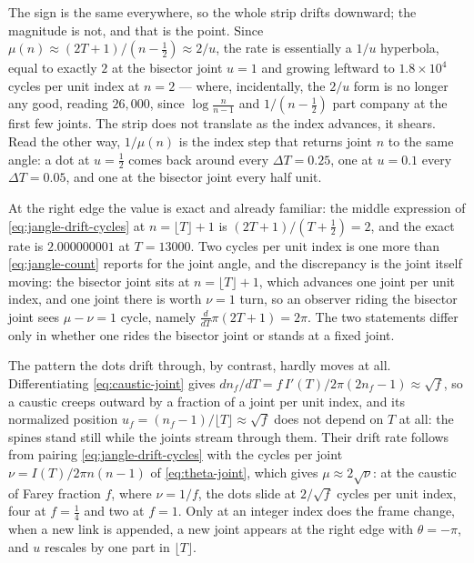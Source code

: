 \documentclass[11pt]{article}
\theoremstyle{definition}
\begin{document}
The sign is the same everywhere, so the whole strip drifts downward; the
magnitude is not, and that is the point. Since
$\mu(n)\approx(2T+1)/(n-\tfrac12)\approx2/u$, the rate is essentially a $1/u$
hyperbola, equal to exactly $2$ at the bisector joint $u=1$ and growing leftward
to $1.8\times10^{4}$ cycles per unit index at $n=2$ --- where, incidentally, the
$2/u$ form is no longer any good, reading $26{,}000$, since
$\log\frac{n}{n-1}$ and $1/(n-\tfrac12)$ part company at the first few joints.
The strip does not translate as the index advances, it shears. Read the other
way, $1/\mu(n)$ is the index step that returns joint $n$ to the same angle: a
dot at $u=\tfrac12$ comes back around every $\Delta T=0.25$, one at $u=0.1$
every $\Delta T=0.05$, and one at the bisector joint every half unit.

At the right edge the value is exact and already familiar: the middle expression
of \eqref{eq:jangle-drift-cycles} at $n=\lfloor T\rfloor+1$ is
$(2T+1)/(T+\tfrac12)=2$, and the exact rate is $2.000000001$ at $T=13000$. Two
cycles per unit index is one more than \eqref{eq:jangle-count} reports for the
joint angle, and the discrepancy is the joint itself moving: the bisector joint sits at
$n=\lfloor T\rfloor+1$, which advances one joint per unit index, and one joint
there is worth $\nu=1$ turn, so an observer riding the bisector joint sees $\mu-\nu=1$
cycle, namely $\frac{d}{dT}\pi(2T+1)=2\pi$. The two statements differ only in
whether one rides the bisector joint or stands at a fixed joint.

The pattern the dots drift through, by contrast, hardly moves at all.
Differentiating \eqref{eq:caustic-joint} gives
$dn_f/dT=f\,I'(T)\big/2\pi(2n_f-1)\approx\sqrt f$, so a caustic creeps outward
by a fraction of a joint per unit index, and its normalized position
$u_f=(n_f-1)/\lfloor T\rfloor\approx\sqrt f$ does not depend on $T$ at all: the
spines stand still while the joints stream through them. Their drift rate
follows from pairing \eqref{eq:jangle-drift-cycles} with the cycles per joint
$\nu=I(T)/2\pi n(n-1)$ of \eqref{eq:theta-joint}, which gives
$\mu\approx2\sqrt\nu$: at the caustic of Farey fraction $f$, where $\nu=1/f$,
the dots slide at $2/\sqrt f$ cycles per unit index, four at $f=\tfrac14$ and
two at $f=1$. Only at an integer index does the frame change, when a new link is
appended, a new joint appears at the right edge with $\theta=-\pi$, and $u$
rescales by one part in $\lfloor T\rfloor$.
\end{document}
